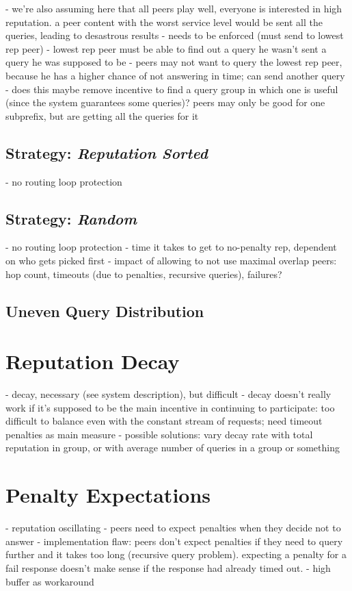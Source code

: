 - we're also assuming here that all peers play well, everyone is interested in
  high reputation. a peer content with the worst service level would be sent all
  the queries, leading to desastrous results
- needs to be enforced (must send to lowest rep peer)
    - lowest rep peer must be able to find out a query he wasn't sent a query he
      was supposed to be
    - peers may not want to query the lowest rep peer, because he has a higher
      chance of not answering in time; can send another query
- does this maybe remove incentive to find a query group in which one is useful
  (since the system guarantees some queries)? peers may only be good for one
  subprefix, but are getting all the queries for it


\subsection{Strategy: \emph{Reputation Sorted}}
- no routing loop protection
\subsection{Strategy: \emph{Random}}
- no routing loop protection
- time it takes to get to no-penalty rep, dependent on who gets picked first
- impact of allowing to not use maximal overlap peers: hop count, timeouts (due
  to penalties, recursive queries), failures?
\subsection{Uneven Query Distribution}

\section{Reputation Decay}
- decay, necessary (see system description), but difficult
- decay doesn't really work if it's supposed to be the main incentive in
  continuing to participate: too difficult to balance even with the constant
  stream of requests; need timeout penalties as main measure
- possible solutions: vary decay rate with total reputation in group, or with
  average number of queries in a group or something

\section{Penalty Expectations}
- reputation oscillating
- peers need to expect penalties when they decide not to answer
- implementation flaw: peers don't expect penalties if they need to query
  further and it takes too long (recursive query problem). expecting a penalty
  for a fail response doesn't make sense if the response had already timed out.
- high buffer as workaround

